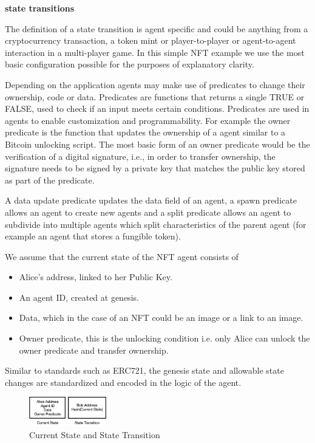 \documentclass{article}
\begin{document}
\textbf{state transitions}
\vspace{2mm}


The definition of a state transition is agent specific and could be anything from a cryptocurrency transaction, a token mint or player-to-player or agent-to-agent interaction in a multi-player game. In this simple NFT example we use the most basic configuration possible for the purposes of explanatory clarity.
\vspace{2mm}

Depending on the application agents may make use of predicates to change their ownership, code or data. Predicates are functions that returns a single TRUE or FALSE, used to check if an input meets certain conditions. Predicates are used in agents to enable customization and programmability. For example the owner predicate is the function that updates the ownership of a agent similar to a Bitcoin unlocking script. The most basic form of an owner predicate would be the verification of a digital signature, i.e., in order to transfer ownership, the signature needs to be signed by a private key that matches the public key stored as part of the predicate.
\vspace{2mm}

A data update predicate updates the data field of an agent, a spawn predicate allows an agent to create new agents and a split predicate allows an agent to subdivide into multiple agents which split characteristics of the parent agent (for example an agent that stores a fungible token).
\vspace{2mm}

We assume that the current state of the NFT agent consists of 

\begin{itemize}
\setlength{\leftmargin}{1em}
 \item  Alice's address, linked to her Public Key.
 \item  An agent ID, created at genesis.
 \item  Data, which in the case of an NFT could be an image or a link to an image.
 \item  Owner  predicate, this is the unlocking condition i.e. only Alice can unlock the owner predicate and transfer ownership.
\end{itemize}

 Similar to standards such as ERC721, the genesis state and allowable state changes are standardized and encoded in the logic of the agent. 

\begin{figure}[htbp]
    \centering
    \includegraphics[width=0.3\textwidth]{CurrentStateAndStateTransition.png}
    \caption{Current State and State Transition}
    \label{fig:CurrentState}
\end{figure}
\end{document}
